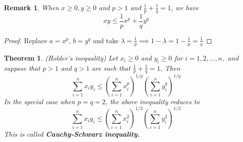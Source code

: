 \documentclass[12pt]{report}
\newtheorem{thm}{Theorem}
\newtheorem*{rem}{Remark}
\begin{document}
\begin{rem}
    When $x \geq 0, y \geq 0$ and $p > 1$ and $\frac{1}{p} + \frac{1}{q} = 1$, we have 
    $$ xy \leq \frac{1}{p}x^p + \frac{1}{q}y^q$$
\end{rem}
\begin{proof}
    Replace $ a = x^p$, $b = y^q$ and take $\lambda = \frac{1}{p} \implies 1-\lambda = 1- \frac{1}{p} = \frac{1}{q}$
\end{proof}
\begin{thm}
    (Holder's inequality) Let $x_i \geq 0$ and $y_i \geq 0$ for $i = 1,2, \dots, n,$ and suppose that $p > 1$ and $q > 1$ are such that $\frac{1}{p} + \frac{1}{q} = 1$. Then
    $$ \sum\limits_{i=1}^n x_iy_i \leq \left(\sum\limits_{i=1}^nx_i^p\right)^{1/p} \left(\sum\limits_{i=1}^ny_i^q\right)^{1/q}$$
    In the special case when $p = q = 2$, the above inequality reduces to 
    $$ \sum\limits_{i=1}^n x_iy_i \leq \left(\sum\limits_{i=1}^nx_i^2\right)^{1/2} \left(\sum\limits_{i=1}^ny_i^2\right)^{1/2}$$
    This is called \textbf{Cauchy-Schwarz inequality.}
\end{thm}
\end{document}
